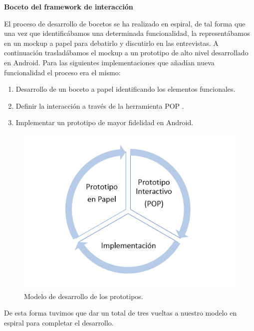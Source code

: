 \textbf{Boceto del framework de interacción}

El proceso de desarrollo de bocetos se ha realizado en espiral, de tal forma que una vez que identificábamos una determinada funcionalidad, la representábamos en un mockup a papel para debatirlo y discutirlo en las entrevistas. A continuación trasladábamos el mockup a un prototipo de alto nivel desarrollado en Android. Para las siguientes implementaciones que añadían nueva funcionalidad el proceso era el mismo:

\begin{enumerate}
 \item Desarrollo de un boceto a papel identificando los elementos funcionales.
 \item Definir la interacción a través de la herramienta POP \cite{ref:pop}.
 \item Implementar un prototipo de mayor fidelidad en Android. 
\end{enumerate}

  \begin{figure}[h]
   \centering
	\includegraphics[keepaspectratio, scale=1]{Media/Captures/prototypesDiagram.png}
    \caption{Modelo de desarrollo de los prototipos.}
   \label{fig:sequenceDiagram_waveWebSocket}
  \end{figure}
  
De esta forma tuvimos que dar un total de tres vueltas a nuestro modelo en espiral para completar el desarrollo.

